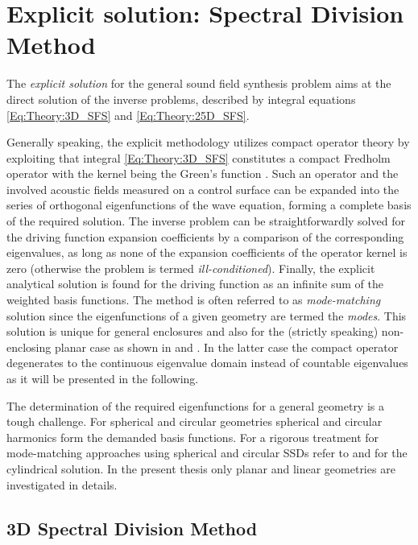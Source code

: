 \section{Explicit solution: Spectral Division Method}

The \emph{explicit solution} for the general sound field synthesis problem aims at the direct solution of the inverse problems, described by integral equations \eqref{Eq:Theory:3D_SFS} and \eqref{Eq:Theory:25D_SFS}.

Generally speaking, the explicit methodology utilizes compact operator theory by exploiting that integral \eqref{Eq:Theory:3D_SFS} constitutes a compact Fredholm operator with the kernel being the Green's function \cite{MorseFeshbach1953, Ahrens2012}.
Such an operator and the involved acoustic fields measured on a control surface can be expanded into the series of orthogonal eigenfunctions of the wave equation, forming a complete basis of the required solution.
The inverse problem can be straightforwardly solved for the driving function expansion coefficients by a comparison of the corresponding eigenvalues, as long as none of the expansion coefficients of the operator kernel is zero (otherwise the problem is termed \emph{ill-conditioned}).
Finally, the explicit analytical solution is found for the driving function as an infinite sum of the weighted basis functions.
The method is often referred to as \emph{mode-matching} solution since the eigenfunctions of a given geometry are termed the \emph{modes}.
This solution is unique for general enclosures
and also for the (strictly speaking) non-enclosing planar case as shown in \cite{Zotter2013:uniqueness} and \cite{Fazi2010}.
In the latter case the compact operator degenerates to the continuous eigenvalue domain instead of countable eigenvalues as it will be presented in the following.

The determination of the required eigenfunctions for a general geometry is a tough challenge.
For spherical and circular geometries spherical and circular harmonics form the demanded basis functions. 
For a rigorous treatment for mode-matching approaches using spherical and circular SSDs refer to \cite{Ahrens2008:Analytical_Circ_Spherical_SFS, Ahrens2009:circularSSD_mismatch, Ahrens2009:circular25D_SFR, Zotter2009phd, Ahrens2010phd, Ahrens2012, Schultz2014:Comparing_approaches} and \cite{Koyama2014, Koyama2014:phd} for the cylindrical solution.
In the present thesis only planar and linear geometries are investigated in details.

\subsection{3D Spectral Division Method}

